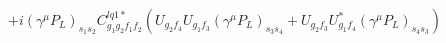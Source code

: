 %
\begin{dmath*}
%
  +  i(\gamma^{\mu} P_L)_{s_1 s_2} C^{lq1*}_{g_1 g_2 f_1 f_2} \left(U_{g_2 f_4} U_{g_1 f_3} (\gamma^{\mu} P_L)_{s_3 s_4} + U_{g_2 f_3} U_{g_1 f_4}^* (\gamma^{\mu} P_L)_{s_4 s_3}\right)
%
\end{dmath*}
%
